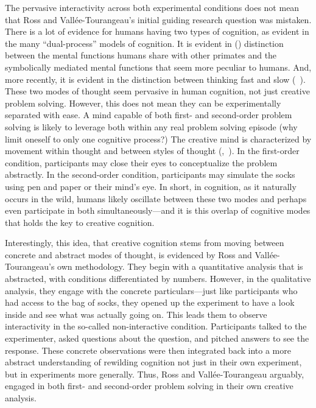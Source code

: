 \documentclass[twocolumn, issue, reflection, authordate]{jote-new-article}
\begin{document}
The pervasive interactivity across both experimental conditions does not
mean that Ross and Vallée-Tourangeau's initial guiding research question
was mistaken. There is a lot of evidence for humans having two types of
cognition, as evident in the many ``dual-process'' models of cognition.
It is evident in  (\citeyear{Vygotsky1994}) distinction between the
mental functions humans share with other primates and the symbolically
mediated mental functions that seem more peculiar to humans. And, more
recently, it is evident in the distinction between thinking fast and
slow (~\citeyear{Kahneman2011}). These two modes of thought seem pervasive in
human cognition, not just creative problem solving. However, this does
not mean they can be experimentally separated with ease. A mind capable
of both first- and second-order problem solving is likely to leverage
both within any real problem solving episode (why limit oneself to only
one cognitive process?) The creative mind is characterized by movement
within thought and between styles of thought (,~\citeyear{Gillespie2013}). In the first-order condition, participants may close their eyes
to conceptualize the problem abstractly. In the second-order condition,
participants may simulate the socks using pen and paper or their mind's
eye. In short, in cognition, as it naturally occurs in the wild, humans
likely oscillate between these two modes and perhaps even participate in
both simultaneously---and it is this overlap of cognitive modes that
holds the key to creative cognition.

Interestingly, this idea, that creative cognition stems from moving
between concrete and abstract modes of thought, is evidenced by Ross and
Vallée-Tourangeau's own methodology. They begin with a quantitative
analysis that is abstracted, with conditions differentiated by numbers.
However, in the qualitative analysis, they engage with the concrete
particulars---just like participants who had access to the bag of socks,
they opened up the experiment to have a look inside and see what was
actually going on. This leads them to observe interactivity in the
so-called non-interactive condition. Participants talked to the
experimenter, asked questions about the question, and pitched answers to
see the response. These concrete observations were then integrated back
into a more abstract understanding of rewilding cognition not just in
their own experiment, but in experiments more generally. Thus, Ross and
Vallée-Tourangeau arguably, engaged in both first- and second-order
problem solving in their own creative analysis.
\end{document}
